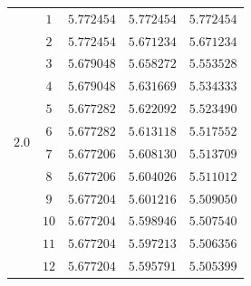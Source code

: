 \documentclass[
    a4paper, aps, twocolumn, floatfix, superscriptaddress,
    nofootinbib]{revtex4-1}
\newcommand{\1}{\mathds{1}}
\begin{document}
\begin{table}
\begin{ruledtabular}
\begin{tabular}{c|c|ccc}
                               &  $1$  & $5.772454$ & $5.772454$ & $5.772454$ \\
                               &  $2$  & $5.772454$ & $5.671234$ & $5.671234$ \\
                               &  $3$  & $5.679048$ & $5.658272$ & $5.553528$ \\
                               &  $4$  & $5.679048$ & $5.631669$ & $5.534333$ \\
                               &  $5$  & $5.677282$ & $5.622092$ & $5.523490$ \\
        \multirow{2}{*}{$2.0$} &  $6$  & $5.677282$ & $5.613118$ & $5.517552$ \\
                               &  $7$  & $5.677206$ & $5.608130$ & $5.513709$ \\
                               &  $8$  & $5.677206$ & $5.604026$ & $5.511012$ \\
                               &  $9$  & $5.677204$ & $5.601216$ & $5.509050$ \\
                               &  $10$ & $5.677204$ & $5.598946$ & $5.507540$ \\
                               &  $11$ & $5.677204$ & $5.597213$ & $5.506356$ \\
                               &  $12$ & $5.677204$ & $5.595791$ & $5.505399$
                \end{tabular}
            \end{ruledtabular}
            \label{tab:N2}
        \end{table}
\end{document}
